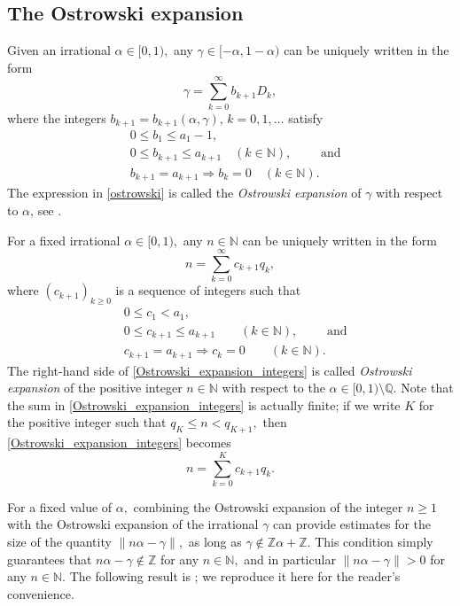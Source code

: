 \documentclass[12pt, reqno]{amsart}
\theoremstyle{definition}
\theoremstyle{remark}
\numberwithin{equation}{section}
\def\alp{{\alpha}} \def\bfalp{{\boldsymbol \alpha}}
\def\gam{{\gamma}} \def\Gam{{\Gamma}}
\def\le{\leqslant} \def\ge{\geqslant}
\def\ls{\leqslant} \def\gs{\geqslant}
\def \bN {\mathbb N}
\def \bQ {\mathbb Q}
\def \bZ {\mathbb Z}
\begin{document}
	\subsection{The Ostrowski expansion}\label{Ostrowski_section} Given an irrational $\alp\in [0,1),$ any $\gam \in [-\alp,1-\alp)$ can be  uniquely written in the form 
	\begin{equation} \label{ostrowski}
		\gam = \sum_{k=0}^\infty b_{k+1} D_k, 
	\end{equation}
	where the integers $b_{k+1} = b_{k+1}(\alp,\gamma), \, k=0,1,\ldots$ satisfy
	\begin{align*}
		& 0 \le b_1 \le a_1 - 1, \\
		& 0 \le b_{k+1} \le a_{k+1} \quad (k \in \bN), \qquad \text{ and} \\
		& b_{k+1}  = a_{k+1} \Longrightarrow b_k = 0 \quad (k \in \bN).
	\end{align*}
	The expression in \eqref{ostrowski} is called the \emph{Ostrowski expansion} of $\gamma$ with respect to $\alp$, see \cite{BHV, RS1992}. 
	
	For a fixed irrational $\alp\in [0,1),$ any $n\in \bN$ can be uniquely written in the form  
	\begin{equation} \label{Ostrowski_expansion_integers}
		n= \sum_{k=0}^\infty c_{k+1} q_k, 
	\end{equation}
	where $(c_{k+1})_{k\gs 0}$ is a sequence of integers such that 
	\begin{align*}
		& 0 \le c_1 < a_1,  \\
		& 0 \le c_{k+1} \le a_{k+1}
		\qquad (k \in \bN), \qquad \text{ and} \\
		&  c_{k+1} = a_{k+1} \Longrightarrow c_k = 0 \qquad (k \in \bN).
	\end{align*}
	The right-hand side of \eqref{Ostrowski_expansion_integers} is called \emph{Ostrowski expansion} of the positive integer  $n \in \bN$ with respect to the $\alp\in [0,1) \setminus \bQ.$ Note that the sum in \eqref{Ostrowski_expansion_integers} is actually finite; if we write $K$ for the positive integer such that $q_K \ls n < q_{K+1},$ then \eqref{Ostrowski_expansion_integers} becomes
	\[
	n = \sum_{k=0}^K c_{k+1}q_k.
	\]
	
	For a fixed value of $\alp,$ combining the Ostrowski expansion of the integer $n\gs 1$ with the Ostrowski expansion of the irrational $\gamma$ can provide estimates for the size of the quantity $\|n\alpha -\gam\|,$ as long as $\gamma\notin \bZ\alp + \bZ.$ This condition simply guarantees that $n\alpha -\gamma\notin\bZ$ for any $n\in\bN,$ and in particular $\|n\alp-\gam\|>0$ for any $n\in\bN.$ The following result is \cite[Lemma 4.3]{BHV}; we reproduce it here for the reader's convenience. 
	
\end{document}
